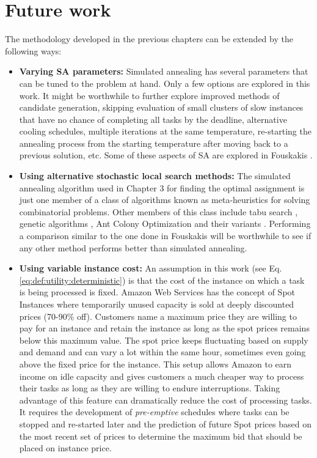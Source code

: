 \documentclass[12pt]{report}
\begin{document}
\section{Future work}

The methodology developed in the previous chapters can be extended by the following ways:

\begin{itemize}

	\item \textbf{Varying SA parameters:} Simulated annealing has several parameters that can be tuned to the problem at hand.
	Only a few options are explored in this work.
	It might be worthwhile to further explore improved methods of candidate generation, skipping evaluation of small clusters of slow instances that have no chance of completing all tasks by the deadline, alternative cooling schedules, multiple iterations at the same temperature, re-starting the annealing process from the starting temperature after moving back to a previous solution, etc. 
	Some of these aspects of SA are explored in Fouskakis \cite{Fouskakis2001}.
	
	\item \textbf{Using alternative stochastic local search methods:} 
	The simulated annealing algorithm \cite{Kirkpatrick1983} used in Chapter 3 for finding the optimal assignment is just one member of a class of algorithms known as meta-heuristics for solving combinatorial problems.
	Other members of this class include tabu search \cite{Glover1989, Glover1990}, genetic algorithms \cite{Holland1992}, Ant Colony Optimization \cite{Dorigo2006} and their variants \cite{Hoos2004}.
	Performing a comparison similar to the one done in Fouskakis \cite{Fouskakis2001} will be worthwhile to see if any other method performs better than simulated annealing.
	
	\item \textbf{Using variable instance cost:} An assumption in this work (see Eq. \ref{eq:def:utility:deterministic}) is that the cost of the instance on which a task is being processed is fixed.
		Amazon Web Services has the concept of Spot Instances \cite{AWS:Spot} where temporarily unused capacity is sold at deeply discounted prices (70-90\% off). 
		Customers name a maximum price they are willing to pay for an instance and retain the instance as long as the spot prices remains below this maximum value.
		The spot price keeps fluctuating based on supply and demand and can vary a lot within the same hour, sometimes even going above the fixed price for the instance.
		This setup allows Amazon to earn income on idle capacity and gives customers a much cheaper way to process their tasks as long as they are willing to endure interruptions.
		Taking advantage of this feature can dramatically reduce the cost of processing tasks.
		It requires the development of \textit{pre-emptive} schedules where tasks can be stopped and re-started later and the prediction of future Spot prices based on the most recent set of prices to determine the maximum bid that should be placed on instance price.
	
\end{itemize}


\newpage
\sloppy
\printbibliography

\appendix

\end{document}

